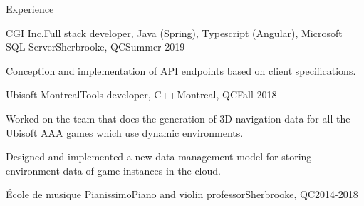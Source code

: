 \documentclass{article}
\newlength{\tabin}
\newlength{\secsep}
\newcommand{\lineunder}{\vspace*{-8pt} \\ \hspace*{-6pt} \hrulefill \\ \vspace*{-15pt}}
\newenvironment{tabbedsection}[1]{
  \begin{list}{}{
      \setlength{\itemsep}{0pt}
      \setlength{\labelsep}{0pt}
      \setlength{\labelwidth}{0pt}
      \setlength{\leftmargin}{\tabin}
      \setlength{\rightmargin}{\tabin}
      \setlength{\listparindent}{0pt}
      \setlength{\parsep}{0pt}
      \setlength{\parskip}{0pt}
      \setlength{\partopsep}{0pt}
      \setlength{\topsep}{#1}
    }
  \item[]
}{\end{list}}
\newenvironment{resume_section}[1]{
  \filbreak
  \vspace{2\secsep}
  \textsc{\large#1}
  \lineunder
  \begin{tabbedsection}{\secsep}
}{\end{tabbedsection}}
\newenvironment{subitems}{
  \renewcommand{\labelitemi}{-}
  \begin{itemize}
      \setlength{\labelsep}{1em}
}{\end{itemize}}
\newenvironment{resume_employer}[4]{
  \vspace{\secsep}
  \textbf{#1} \\ 
  \indent {\small #2} \hfill {\footnotesize#3 (#4)}
  \begin{tabbedsection}{0pt}
  \begin{subitems}
}{\end{subitems}\end{tabbedsection}}
\begin{document}
\begin{resume_section}{Experience}
  \begin{resume_employer}{CGI Inc.}{Full stack developer, Java (Spring), Typescript (Angular), Microsoft SQL Server}{Sherbrooke, QC}{Summer 2019}
    \item Conception and implementation of API endpoints based on client specifications.
  \end{resume_employer}
  
    \begin{resume_employer}{Ubisoft Montreal}{Tools developer, C++}{Montreal, QC}{Fall 2018} 
    \item Worked on the team that does the generation of 3D navigation data for all the Ubisoft AAA games which use dynamic environments.
    \item Designed and implemented a new data management model for storing environment data of game instances in the cloud.
  \end{resume_employer}
  
  \begin{resume_employer}{École de musique Pianissimo}{Piano and violin professor}{Sherbrooke, QC}{2014-2018}
  \end{resume_employer}
\end{resume_section}
\end{document}
